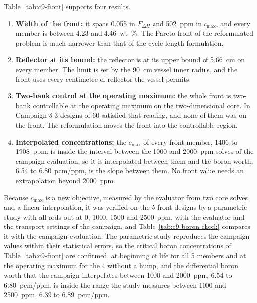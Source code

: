 Table~\ref{tab:c9-front} supports four results.

\begin{enumerate}
  \item \textbf{Width of the front:} it spans 0.055 in $F_{\Delta H}$ and
        \SI{502}{ppm} in $c_\mathrm{max}$, and every member is between
        4.23 and \SI{4.46}{wt\%}. The Pareto front of the reformulated problem is much narrower than that of the cycle-length formulation.

  \item \textbf{Reflector at its bound:} the reflector is at its upper
        bound of \SI{5.66}{cm} on every member. The limit is set by the
        \SI{90}{cm} vessel inner radius, and the front uses every
        centimetre of reflector the vessel permits.

  \item \textbf{Two-bank control at the operating maximum:} the whole
        front is two-bank controllable at the operating maximum on the
        two-dimensional core. In Campaign 8 3 designs of 60 satisfied that reading, and none of them was on the front. The reformulation
        moves the front into the controllable region.

  \item \textbf{Interpolated concentrations:} the $c_\mathrm{max}$ of
        every front member, 1406 to \SI{1908}{ppm}, is inside the interval
        between the 1000 and \SI{2000}{ppm} solves of the campaign
        evaluation, so it is interpolated between them and the boron
        worth, 6.54 to \SI{6.80}{pcm/ppm}, is the slope between them. No
        front value needs an extrapolation beyond \SI{2000}{ppm}.
\end{enumerate}

Because $c_\mathrm{max}$ is a new objective, measured by the evaluator
from two core solves and a linear interpolation, it was verified on the
5 front designs by a parametric study with all rods out at 0, 1000,
1500 and \SI{2500}{ppm}, with the evaluator and the transport settings
of the campaign, and
Table~\ref{tab:c9-boron-check} compares it with the campaign
evaluation.  The parametric study reproduces the campaign values within
their statistical errors, so the critical boron concentrations of
Table~\ref{tab:c9-front} are confirmed, at beginning of life for all 5
members and at the operating maximum for the 4 without a hump, and the
differential boron worth that the campaign interpolates between 1000
and \SI{2000}{ppm}, 6.54 to \SI{6.80}{pcm/ppm}, is inside the range the
study measures between 1000 and \SI{2500}{ppm}, 6.39 to
\SI{6.89}{pcm/ppm}.

